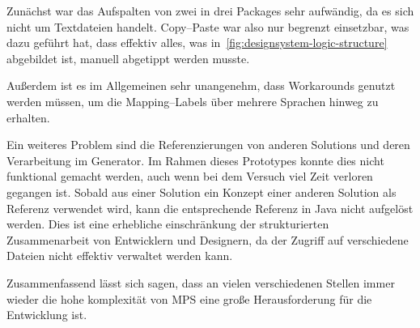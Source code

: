 Zunächst war das Aufspalten von zwei in drei Packages sehr aufwändig, da es sich nicht um Textdateien handelt.
Copy--Paste war also nur begrenzt einsetzbar, was dazu geführt hat, dass effektiv alles, was in~\autoref{fig:designsystem-logic-structure} abgebildet ist, manuell abgetippt werden musste.

Außerdem ist es im Allgemeinen sehr unangenehm, dass Workarounds genutzt werden müssen, um die Mapping--Labels über mehrere Sprachen hinweg zu erhalten.

Ein weiteres Problem sind die Referenzierungen von anderen Solutions und deren Verarbeitung im Generator.
Im Rahmen dieses Prototypes konnte dies nicht funktional gemacht werden, auch wenn bei dem Versuch viel Zeit verloren gegangen ist.
Sobald aus einer Solution ein Konzept einer anderen Solution als Referenz verwendet wird, kann die entsprechende Referenz in Java nicht aufgelöst werden.
Dies ist eine erhebliche einschränkung der strukturierten Zusammenarbeit von Entwicklern und Designern, da der Zugriff auf verschiedene Dateien nicht effektiv verwaltet werden kann.

Zusammenfassend lässt sich sagen, dass an vielen verschiedenen Stellen immer wieder die hohe komplexität von \ac{MPS} eine große Herausforderung für die Entwicklung ist.
